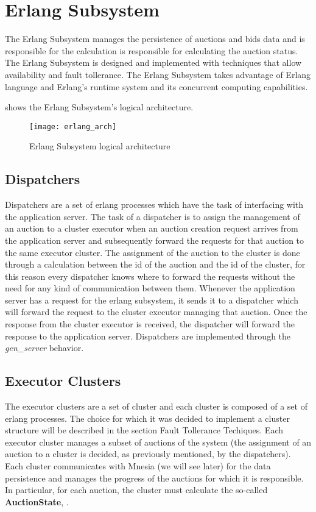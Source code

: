 \section{Erlang Subsystem}\label{sec:erlang_subsystem}

The Erlang Subsystem manages the persistence of auctions and bids data and is
responsible for the calculation is responsible for calculating the auction
status. The Erlang Subsystem is designed and implemented with techniques that
allow availability and fault tollerance. The Erlang Subsystem takes advantage of
Erlang language and Erlang's runtime system and its concurrent computing
capabilities.

 shows the Erlang Subsystem's logical architecture.

\begin{figure}[h]
	\centering
	\texttt{[image: erlang\_arch]}
	\caption{Erlang Subsystem logical architecture}\label{fig:erlang_arch}
\end{figure}

\subsection{Dispatchers}

Dispatchers are a set of erlang processes which have the task of interfacing
with the application server. The task of a dispatcher is to assign the
management of an auction to a cluster executor when an auction creation request
arrives from the application server and subsequently forward the requests for
that auction to the same executor cluster. The assignment of the auction to the
cluster is done through a calculation between the id of the auction and the id
of the cluster, for this reason every dispatcher knows where to forward the
requests without the need for any kind of communication between them. Whenever
the application server has a request for the erlang subsystem, it sends it to a
dispatcher which will forward the request to the cluster executor managing that
auction. Once the response from the cluster executor is received, the dispatcher
will forward the response to the application server. Dispatchers are implemented
through the \textit{gen\_server} behavior.

\subsection{Executor Clusters}

The executor clusters are a set of cluster and each cluster is composed of a set
of erlang processes. The choice for which it was decided to implement a cluster
structure will be described in the section Fault Tollerance Techiques. Each
executor cluster manages a subset of auctions of the system (the assignment of
an auction to a cluster is decided, as previously mentioned, by the
dispatchers). Each cluster communicates with Mnesia (we will see later) for the
data persistence and manages the progress of the auctions for which it is
responsible. In particular, for each auction, the cluster must calculate the
so-called \textbf{AuctionState}, .


